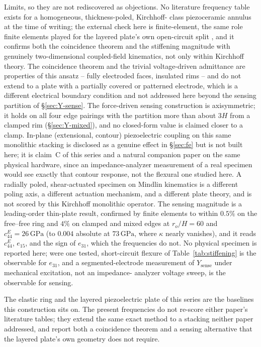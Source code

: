 \documentclass[11pt]{article}
\begin{document}
Limits, so they are not rediscovered as objections. No literature
frequency table exists for a homogeneous, thickness-poled, Kirchhoff-%
class piezoceramic annulus at the time of writing; the external check
here is finite-element, the same role finite elements played for the
layered plate's own open-circuit split \cite{mccune2026piezo}, and it
confirms both the coincidence theorem and the stiffening magnitude with
genuinely two-dimensional coupled-field kinematics, not only within
Kirchhoff theory. The coincidence theorem and the trivial voltage-driven
admittance are properties of this ansatz -- fully electroded faces,
insulated rims -- and do not extend to a plate with a partially covered
or patterned electrode, which is a different electrical boundary
condition and not addressed here beyond the sensing partition of
\S\ref{sec:Y-sense}. The force-driven sensing construction is
axisymmetric; it holds on all four edge pairings with the partition more
than about $3H$ from a clamped rim (\S\ref{sec:Y-mixed}), and no
closed-form value is claimed closer to a clamp. In-plane (extensional, contour)
piezoelectric coupling on this same monolithic stacking is disclosed as a
genuine effect in \S\ref{sec:fe} but is not built here; it is claim~C of
this series \cite{mccune2026piezo} and a natural companion paper on the
same physical hardware, since an impedance-analyzer measurement of a real
specimen would see exactly that contour response, not the flexural one
studied here. A radially poled, shear-actuated specimen on Mindlin
kinematics \cite{parashar2013} is a different poling axis, a different
actuation mechanism, and a different plate theory, and is not scored by
this Kirchhoff monolithic operator. The sensing magnitude is a
leading-order thin-plate result, confirmed by finite elements to within
$0.5\%$ on the free--free ring and $4\%$ on clamped and mixed edges at
$r_o/H=60$ and $c_{44}^E=26\,\mathrm{GPa}$ (to $0.004$ absolute at
$73\,\mathrm{GPa}$, where $\kappa$ nearly vanishes), and it reads $c_{44}^E$, $e_{15}$, and the sign of
$e_{31}$, which the frequencies do not. No physical specimen is reported
here; were one tested, short-circuit flexure of Table~\ref{tab:stiffening}
is the observable for $e_{31}$, and a segmented-electrode measurement of
$Y_{\mathrm{sense}}$ under mechanical excitation, not an impedance-%
analyzer voltage sweep, is the observable for sensing.

The elastic ring and the layered piezoelectric plate of this series
\cite{mccune2026ring,mccune2026piezo} are the baselines this construction
sits on. The present frequencies do not re-score either paper's
literature tables; they extend the same exact method to a stacking
neither paper addressed, and report both a coincidence theorem and a
sensing alternative that the layered plate's own geometry does not
require.
\end{document}

